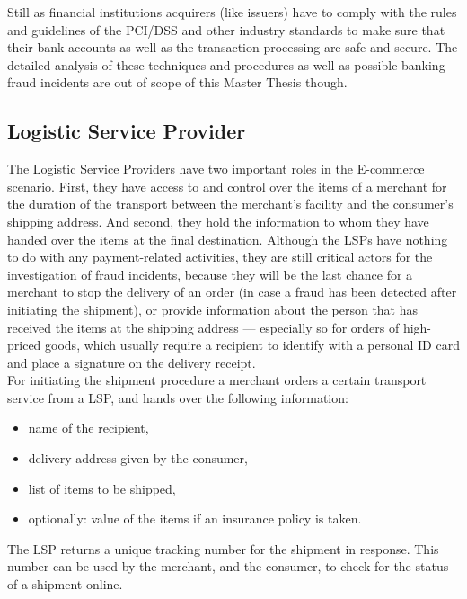 Still as financial institutions acquirers (like issuers) have to comply with the rules and guidelines of the \gls{PCI/DSS} and other industry standards to make sure that their bank accounts as well as the transaction processing are safe and secure. The detailed analysis of these techniques and procedures as well as possible banking fraud incidents are out of scope of this Master Thesis though.


\subsection{Logistic Service Provider}
\label{subsec:stakeholder_lsp}

The Logistic Service Providers have two important roles in the \gls{E-commerce} scenario. First, they have access to and control over the items of a merchant for the duration of the transport between the merchant's facility and the consumer's shipping address. And second, they hold the information to whom they have handed over the items at the final destination. Although the \gls{LSP}s have nothing to do with any payment-related activities, they are still critical actors for the investigation of fraud incidents, because they will be the last chance for a merchant to stop the delivery of an order (in case a fraud has been detected after initiating the shipment), or provide information about the person  that has received the items at the shipping address --- especially so for orders of high-priced goods, which usually require a recipient to identify with a personal ID card and place a signature on the delivery receipt. \\

For initiating the shipment procedure a merchant orders a certain transport service from a \gls{LSP}, and hands over the following information:\@

\begin{itemize}
	\item name of the recipient,
	\item delivery address given by the consumer,
	\item list of items to be shipped,
	\item optionally: value of the items if an insurance policy is taken.
\end{itemize}

The \gls{LSP} returns a unique tracking number for the shipment in response. This number can be used by the merchant, and the consumer, to check for the status of a shipment online. \\

